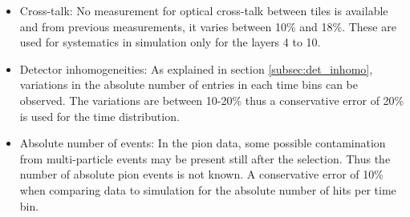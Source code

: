 \begin{itemize}
	\item Cross-talk: No measurement for optical cross-talk between tiles is available and from previous measurements, it varies between 10\% and 18\%. These are used for systematics in simulation only for the layers 4 to 10.
	\item Detector inhomogeneities: As explained in section \ref{subsec:det_inhomo}, variations in the absolute number of entries in each time bins can be observed. The variations are between 10-20\% thus a conservative error of 20\% is used for the time distribution.
	\item Absolute number of events: In the pion data, some possible contamination from multi-particle events may be present still after the selection. Thus the number of absolute pion events is not known. A conservative error of 10\% when comparing data to simulation for the absolute number of hits per time bin.
\end{itemize}

